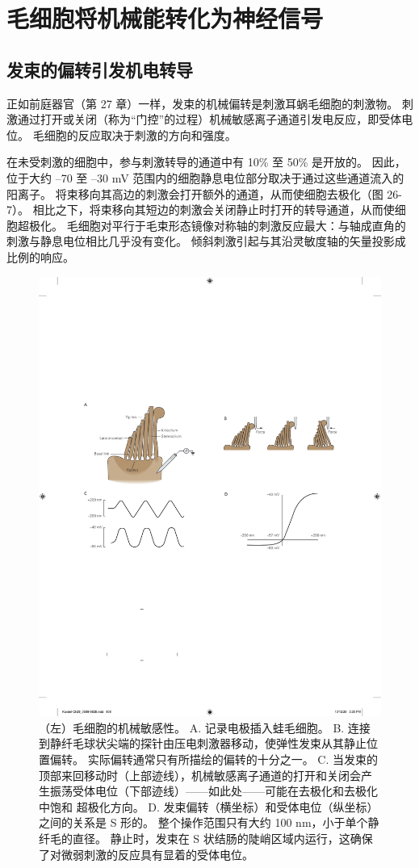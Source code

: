 \section{毛细胞将机械能转化为神经信号}


\subsection{发束的偏转引发机电转导}
正如前庭器官（第 27 章）一样，发束的机械偏转是刺激耳蜗毛细胞的刺激物。 
刺激通过打开或关闭（称为“门控”的过程）机械敏感离子通道引发电反应，即受体电位。 
毛细胞的反应取决于刺激的方向和强度。


在未受刺激的细胞中，参与刺激转导的通道中有 10\% 至 50\% 是开放的。 
因此，位于大约 –70 至 –30 mV 范围内的细胞静息电位部分取决于通过这些通道流入的阳离子。 
将束移向其高边的刺激会打开额外的通道，从而使细胞去极化（图 26-7）。 
相比之下，将束移向其短边的刺激会关闭静止时打开的转导通道，从而使细胞超极化。 
毛细胞对平行于毛束形态镜像对称轴的刺激反应最大：与轴成直角的刺激与静息电位相比几乎没有变化。 
倾斜刺激引起与其沿灵敏度轴的矢量投影成比例的响应。

\begin{figure}[htbp]
	\centering
	\includegraphics[width=0.5\linewidth]{chap26/fig_26_7}
	\caption{（左）毛细胞的机械敏感性。 
		A. 记录电极插入蛙毛细胞。 
		B. 连接到静纤毛球状尖端的探针由压电刺激器移动，使弹性发束从其静止位置偏转。 
		实际偏转通常只有所描绘的偏转的十分之一。 
		C. 当发束的顶部来回移动时（上部迹线），机械敏感离子通道的打开和关闭会产生振荡受体电位（下部迹线）——如此处——可能在去极化和去极化中饱和 超极化方向。 
		D. 发束偏转（横坐标）和受体电位（纵坐标）之间的关系是 S 形的。 
		整个操作范围只有大约 100 nm，小于单个静纤毛的直径。 
		静止时，发束在 S 状结肠的陡峭区域内运行，这确保了对微弱刺激的反应具有显着的受体电位。}
	\label{fig:26_7}
\end{figure}


